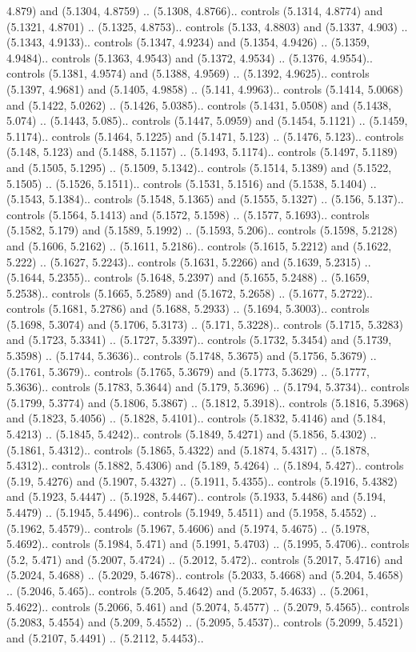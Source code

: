 4.879) and (5.1304, 4.8759) .. (5.1308, 4.8766).. controls (5.1314, 4.8774) and (5.1321, 4.8701) .. (5.1325, 4.8753).. controls (5.133, 4.8803) and (5.1337, 4.903) .. (5.1343, 4.9133).. controls (5.1347, 4.9234) and (5.1354, 4.9426) .. (5.1359, 4.9484).. controls (5.1363, 4.9543) and (5.1372, 4.9534) .. (5.1376, 4.9554).. controls (5.1381, 4.9574) and (5.1388, 4.9569) .. (5.1392, 4.9625).. controls (5.1397, 4.9681) and (5.1405, 4.9858) .. (5.141, 4.9963).. controls (5.1414, 5.0068) and (5.1422, 5.0262) .. (5.1426, 5.0385).. controls (5.1431, 5.0508) and (5.1438, 5.074) .. (5.1443, 5.085).. controls (5.1447, 5.0959) and (5.1454, 5.1121) .. (5.1459, 5.1174).. controls (5.1464, 5.1225) and (5.1471, 5.123) .. (5.1476, 5.123).. controls (5.148, 5.123) and (5.1488, 5.1157) .. (5.1493, 5.1174).. controls (5.1497, 5.1189) and (5.1505, 5.1295) .. (5.1509, 5.1342).. controls (5.1514, 5.1389) and (5.1522, 5.1505) .. (5.1526, 5.1511).. controls (5.1531, 5.1516) and (5.1538, 5.1404) .. (5.1543, 5.1384).. controls (5.1548, 5.1365) and (5.1555, 5.1327) .. (5.156, 5.137).. controls (5.1564, 5.1413) and (5.1572, 5.1598) .. (5.1577, 5.1693).. controls (5.1582, 5.179) and (5.1589, 5.1992) .. (5.1593, 5.206).. controls (5.1598, 5.2128) and (5.1606, 5.2162) .. (5.1611, 5.2186).. controls (5.1615, 5.2212) and (5.1622, 5.222) .. (5.1627, 5.2243).. controls (5.1631, 5.2266) and (5.1639, 5.2315) .. (5.1644, 5.2355).. controls (5.1648, 5.2397) and (5.1655, 5.2488) .. (5.1659, 5.2538).. controls (5.1665, 5.2589) and (5.1672, 5.2658) .. (5.1677, 5.2722).. controls (5.1681, 5.2786) and (5.1688, 5.2933) .. (5.1694, 5.3003).. controls (5.1698, 5.3074) and (5.1706, 5.3173) .. (5.171, 5.3228).. controls (5.1715, 5.3283) and (5.1723, 5.3341) .. (5.1727, 5.3397).. controls (5.1732, 5.3454) and (5.1739, 5.3598) .. (5.1744, 5.3636).. controls (5.1748, 5.3675) and (5.1756, 5.3679) .. (5.1761, 5.3679).. controls (5.1765, 5.3679) and (5.1773, 5.3629) .. (5.1777, 5.3636).. controls (5.1783, 5.3644) and (5.179, 5.3696) .. (5.1794, 5.3734).. controls (5.1799, 5.3774) and (5.1806, 5.3867) .. (5.1812, 5.3918).. controls (5.1816, 5.3968) and (5.1823, 5.4056) .. (5.1828, 5.4101).. controls (5.1832, 5.4146) and (5.184, 5.4213) .. (5.1845, 5.4242).. controls (5.1849, 5.4271) and (5.1856, 5.4302) .. (5.1861, 5.4312).. controls (5.1865, 5.4322) and (5.1874, 5.4317) .. (5.1878, 5.4312).. controls (5.1882, 5.4306) and (5.189, 5.4264) .. (5.1894, 5.427).. controls (5.19, 5.4276) and (5.1907, 5.4327) .. (5.1911, 5.4355).. controls (5.1916, 5.4382) and (5.1923, 5.4447) .. (5.1928, 5.4467).. controls (5.1933, 5.4486) and (5.194, 5.4479) .. (5.1945, 5.4496).. controls (5.1949, 5.4511) and (5.1958, 5.4552) .. (5.1962, 5.4579).. controls (5.1967, 5.4606) and (5.1974, 5.4675) .. (5.1978, 5.4692).. controls (5.1984, 5.471) and (5.1991, 5.4703) .. (5.1995, 5.4706).. controls (5.2, 5.471) and (5.2007, 5.4724) .. (5.2012, 5.472).. controls (5.2017, 5.4716) and (5.2024, 5.4688) .. (5.2029, 5.4678).. controls (5.2033, 5.4668) and (5.204, 5.4658) .. (5.2046, 5.465).. controls (5.205, 5.4642) and (5.2057, 5.4633) .. (5.2061, 5.4622).. controls (5.2066, 5.461) and (5.2074, 5.4577) .. (5.2079, 5.4565).. controls (5.2083, 5.4554) and (5.209, 5.4552) .. (5.2095, 5.4537).. controls (5.2099, 5.4521) and (5.2107, 5.4491) .. (5.2112, 5.4453).. 